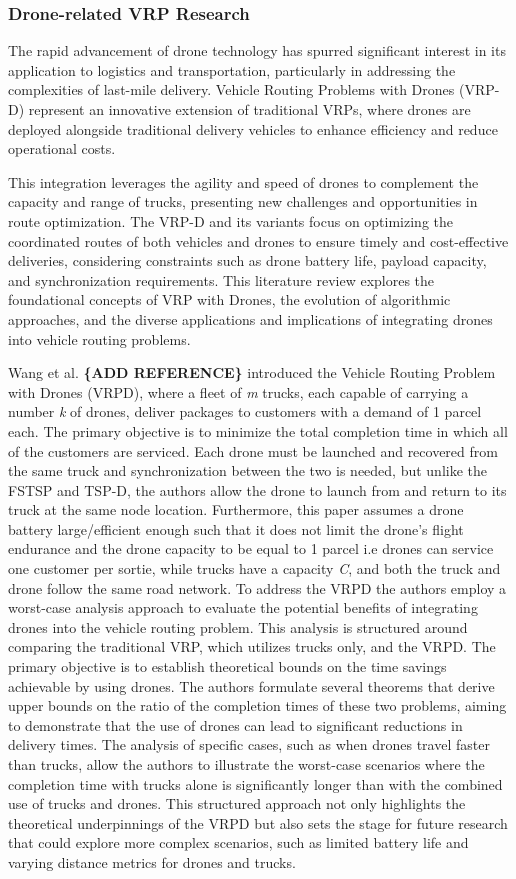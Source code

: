 \documentclass{article}
\begin{document}
	\subsubsection{Drone-related VRP Research}
	The rapid advancement of drone technology has spurred significant interest in its application to logistics and transportation, particularly in addressing the complexities of last-mile delivery. Vehicle Routing Problems with Drones (VRP-D) represent an innovative extension of traditional VRPs, where drones are deployed alongside traditional delivery vehicles to enhance efficiency and reduce operational costs.
	\par
	This integration leverages the agility and speed of drones to complement the capacity and range of trucks, presenting new challenges and opportunities in route optimization. The VRP-D and its variants focus on optimizing
	the coordinated routes of both vehicles and drones to ensure timely and cost-effective deliveries, considering constraints such as drone battery life, payload capacity, and synchronization requirements. This literature review explores the foundational concepts of VRP with Drones, the evolution of algorithmic approaches, and the diverse applications and implications of integrating drones into vehicle routing problems.
	\par 
	Wang et al. \textbf{\{ADD REFERENCE\}} introduced the Vehicle Routing Problem with Drones (VRPD), where a ﬂeet of \textit{m} trucks, each capable of carrying a number \textit{k} of drones, deliver packages to customers with a demand of 1 parcel each. The primary objective is to minimize the total completion time in which all of the customers are serviced. Each drone must be launched and recovered from the same truck and synchronization between the two is needed, but unlike the FSTSP and TSP-D, the authors allow the drone to launch from and return to its truck at the same node location. Furthermore, this paper assumes a drone battery large/efficient enough such that it does not limit the drone's flight endurance and the drone capacity to be equal to 1 parcel i.e drones can service one customer per sortie, while trucks have a capacity \textit{C}, and both the truck and drone follow the same road network. To address the VRPD the authors employ a worst-case analysis approach to evaluate the potential benefits of integrating drones into the vehicle routing problem. This analysis is structured around comparing the traditional VRP, which utilizes trucks only, and the VRPD. The primary objective is to establish theoretical bounds on the time savings achievable by using drones. The authors formulate several theorems that derive upper bounds on the ratio of the completion times of these two problems, aiming to demonstrate that the use of drones can lead to significant reductions in delivery times. The analysis of specific cases, such as when drones travel faster than trucks, allow the authors to illustrate the worst-case scenarios where the completion time with trucks alone is significantly longer than with the combined use of trucks and drones. This structured approach not only highlights the theoretical underpinnings of the VRPD but also sets the stage for future research that could explore more complex scenarios, such as limited battery life and varying distance metrics for drones and trucks.
\end{document}

